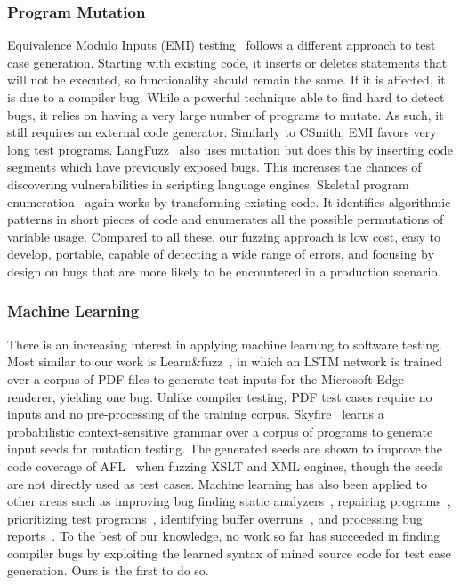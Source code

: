 \subsubsection{Program Mutation}

Equivalence Modulo Inputs (EMI) testing~\cite{Le2013a,Sun2016a} follows a
different approach to test case generation. Starting with existing code, it
inserts or deletes statements that will not be executed, so functionality should
remain the same. If it is affected, it is due to a compiler bug. While a
powerful technique able to find hard to detect bugs, it relies on having a very
large number of programs to mutate. As such, it still requires an external code
generator. Similarly to CSmith, EMI favors very long test programs.
LangFuzz~\cite{Holler2012} also uses mutation but does this by inserting code
segments which have previously exposed bugs. This increases the chances of
discovering vulnerabilities in scripting language engines. Skeletal program
enumeration~\cite{Zhang2017a} again works by transforming existing code. It
identifies algorithmic patterns in short pieces of code and enumerates all the
possible permutations of variable usage. Compared to all these, our fuzzing
approach is low cost, easy to develop, portable, capable of detecting a wide
range of errors, and focusing by design on bugs that are more likely to be
encountered in a production scenario.

\subsubsection{Machine Learning}

There is an increasing interest in applying machine learning to software
testing. Most similar to our work is Learn\&fuzz~\cite{Godefroid2017}, in which
an LSTM network is trained over a corpus of PDF files to generate test inputs
for the Microsoft Edge renderer, yielding one bug. Unlike compiler testing, PDF
test cases require no inputs and no pre-processing of the training corpus.
Skyfire~\cite{Wang2017c} learns a probabilistic context-sensitive grammar over a
corpus of programs to generate input seeds for mutation testing. The generated
seeds are shown to improve the code coverage of AFL~\cite{Zalewski} when fuzzing
XSLT and XML engines, though the seeds are not directly used as test cases.
Machine learning has also been applied to other areas such as improving bug
finding static analyzers~\cite{Heo2017,Koc2017}, repairing
programs~\cite{Koukoutos2017a,White}, prioritizing test
programs~\cite{Chen2017}, identifying buffer overruns~\cite{Choi2016}, and
processing bug reports~\cite{Lam2016,Huo2016}. To the best of our knowledge, no
work so far has succeeded in finding compiler bugs by exploiting the learned
syntax of mined source code for test case generation. Ours is the first to do
so.



